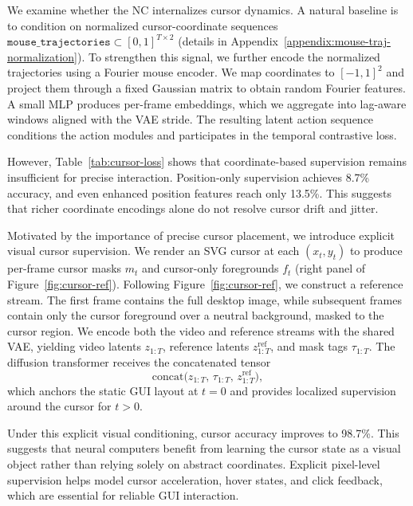 We examine whether the NC internalizes cursor dynamics.
A natural baseline is to condition on normalized cursor-coordinate sequences $\texttt{mouse\_trajectories}\subset[0,1]^{T\times 2}$ (details in Appendix~\ref{appendix:mouse-traj-normalization}). 
%
To strengthen this signal, we further encode the normalized trajectories using a Fourier mouse encoder.
We map coordinates to $[-1,1]^2$ and project them through a fixed Gaussian matrix to obtain random Fourier features.
A small MLP produces per-frame embeddings, which we aggregate into lag-aware windows aligned with the VAE stride.
The resulting latent action sequence conditions the action modules and participates in the temporal contrastive loss.

However, Table~\ref{tab:cursor-loss} shows that coordinate-based supervision remains insufficient for precise interaction.
Position-only supervision achieves 8.7\% accuracy, and even enhanced position features reach only 13.5\%.
This suggests that richer coordinate encodings alone do not resolve cursor drift and jitter.

Motivated by the importance of precise cursor placement, we introduce explicit visual cursor supervision.
We render an SVG cursor at each $(x_t,y_t)$ to produce per-frame cursor masks $m_t$ and cursor-only foregrounds $f_t$ (right panel of Figure~\ref{fig:cursor-ref}).
Following Figure~\ref{fig:cursor-ref}, we construct a reference stream.
The first frame contains the full desktop image, while subsequent frames contain only the cursor foreground over a neutral background, masked to the cursor region.
We encode both the video and reference streams with the shared VAE, yielding video latents $z_{1:T}$, reference latents $z^{\text{ref}}_{1:T}$, and mask tags $\tau_{1:T}$.
The diffusion transformer receives the concatenated tensor
\[
  \mathrm{concat}\bigl(z_{1:T},\,\tau_{1:T},\,z^{\text{ref}}_{1:T}\bigr),
\]
which anchors the static GUI layout at $t{=}0$ and provides localized supervision around the cursor for $t{>}0$.

Under this explicit visual conditioning, cursor accuracy improves to 98.7\%.
This suggests that neural computers benefit from learning the cursor state as a visual object rather than relying solely on abstract coordinates.
Explicit pixel-level supervision helps model cursor acceleration, hover states, and click feedback, which are essential for reliable GUI interaction.





